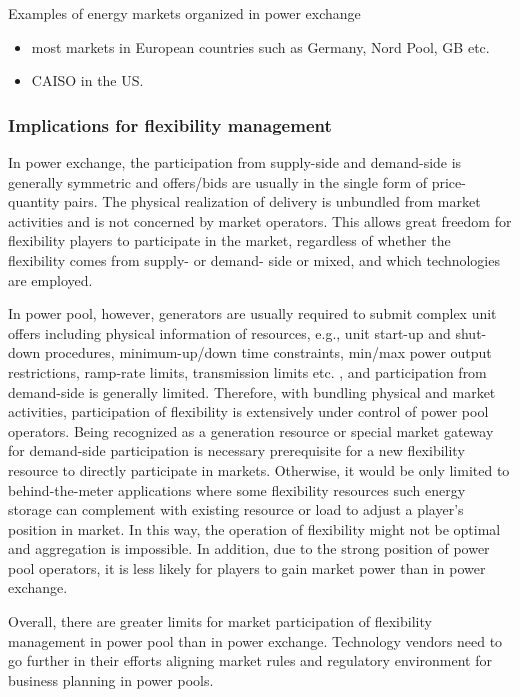Examples of energy markets organized in power exchange
	\begin{itemize}
		\item most markets in European countries such as Germany, Nord Pool, GB etc.
		\item CAISO in the US.
	\end{itemize}

\subsubsection{Implications for flexibility management}
In power exchange, the participation from supply-side and demand-side is generally symmetric and offers/bids are usually in the single form of price-quantity pairs. The physical realization of delivery is unbundled  from market activities and is not concerned by market operators. This allows great freedom for flexibility players to participate in the market, regardless of whether the flexibility comes from supply- or demand- side or mixed, and which technologies are employed. 

In power pool, however, generators are usually required to submit complex unit offers including physical information of resources, e.g., unit start-up and shut-down procedures, minimum-up/down time constraints, min/max power output restrictions, ramp-rate limits, transmission limits etc. \cite{Kardakos2013}, and participation from demand-side is generally limited. Therefore, with bundling physical and market activities, participation of flexibility is extensively under control of power pool operators. Being recognized as a generation resource or special market gateway for demand-side participation is necessary prerequisite for a new flexibility resource to directly participate in markets. Otherwise, it would be only limited to behind-the-meter applications where some flexibility resources such energy storage can complement with existing resource or load to adjust a player's position in market. In this way, the operation of flexibility might not be optimal and aggregation is impossible. In addition, due to the strong position of power pool operators, it is less likely for players to gain market power than in power exchange.

Overall, there are greater limits for market participation of flexibility management in power pool than in power exchange. Technology vendors need to go further in their efforts aligning market rules and regulatory environment for business planning in power pools. 

